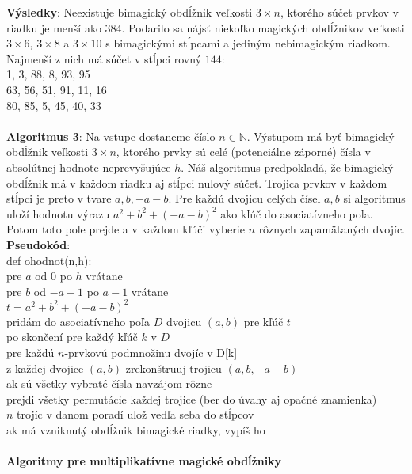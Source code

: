 \documentclass[12pt]{article}
\begin{document}
\textbf{Výsledky}: Neexistuje bimagický obdĺžnik veľkosti $3 \times n$, ktorého súčet prvkov v riadku je menší ako $384$. Podarilo sa nájsť niekoľko magických obdĺžnikov veľkosti $3 \times 6$, $3 \times 8$ a $3 \times 10$ s bimagickými stĺpcami a jediným nebimagickým riadkom. Najmenší z nich má súčet v stĺpci rovný $144$: \\
1, 3, 88, 8, 93, 95 \\
63, 56, 51, 91, 11, 16 \\
80, 85, 5, 45, 40, 33 \\\\

\textbf{Algoritmus 3}: Na vstupe dostaneme číslo $n \in \mathbb{N}$. Výstupom má byť bimagický obdĺžnik veľkosti $3 \times n$, ktorého prvky sú celé (potenciálne záporné) čísla v absolútnej hodnote neprevyšujúce $h$. Náš algoritmus predpokladá, že bimagický obdĺžnik má v každom riadku aj stĺpci nulový súčet. Trojica prvkov v každom stĺpci je preto v tvare $a, b, -a-b$. Pre každú dvojicu celých čísel $a,b$ si algoritmus uloží hodnotu výrazu $a^2 + b^2 + (-a-b)^2$ ako kľúč do asociatívneho poľa. Potom toto pole prejde a v každom kľúči vyberie $n$ rôznych zapamätaných dvojíc. \\

\textbf{Pseudokód}: \\
def ohodnot(n,h): \\
pre $a$ od $0$ po $h$ vrátane \\
pre $b$ od $-a+1$ po $a-1$ vrátane \\
$t = a^2 + b^2 + (-a-b)^2$ \\
pridám do asociatívneho poľa $D$ dvojicu $(a,b)$ pre kľúč $t$ \\
po skončení pre každý kľúč $k$ v $D$ \\
pre každú $n$-prvkovú podmnožinu dvojíc v D[k] \\
z každej dvojice $(a,b)$ zrekonštruuj trojicu $(a,b,-a-b)$ \\
ak sú všetky vybraté čísla navzájom rôzne \\
prejdi všetky permutácie každej trojice (ber do úvahy aj opačné znamienka) \\
$n$ trojíc v danom poradí ulož vedľa seba do stĺpcov \\
ak má vzniknutý obdĺžnik bimagické riadky, vypíš ho \\\\

\textbf{Algoritmy pre multiplikatívne magické obdĺžniky} \\
\end{document}
